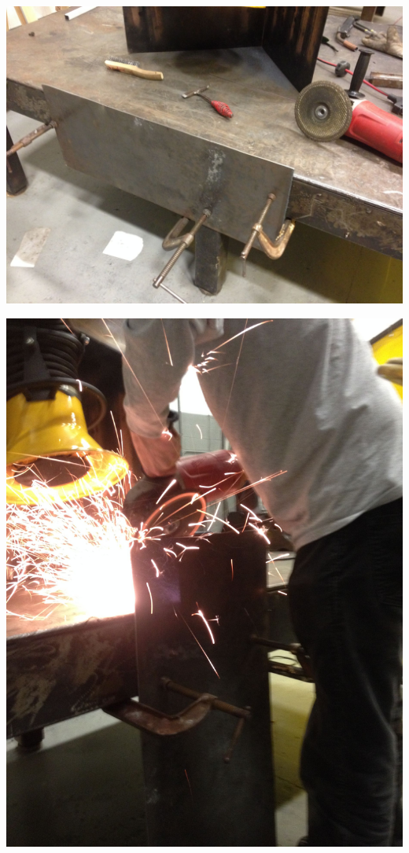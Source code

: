 \documentclass[11pt]{article} %
\begin{document}
\begin{center}
\includegraphics[scale=0.12]{roofmount/01.jpeg}
\end{center}

\begin{center}
\includegraphics[scale=0.12]{roofmount/02.jpeg}
\end{center}
\end{document}
